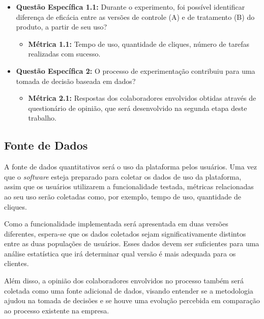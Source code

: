 \begin{itemize}
    \item \textbf{Questão Específica 1.1:}  Durante o experimento, foi possível identificar diferença de eficácia entre as versões de controle (A) e de tratamento (B) do produto, a partir de seu uso? 
    \begin{itemize}
        \item \textbf{Métrica 1.1:} Tempo de uso, quantidade de cliques, número de tarefas realizadas com sucesso.
    \end{itemize}
  
    \item\textbf{Questão Específica 2:} O processo de experimentação contribuiu para uma tomada de decisão baseada em dados?

    \begin{itemize}
        \item\textbf{Métrica 2.1:} Respostas dos colaboradores envolvidos obtidas através de questionário de opinião, que será desenvolvido na segunda etapa deste trabalho.
    \end{itemize}
    
\end{itemize}

\subsection{Fonte de Dados}

A fonte de dados quantitativos será o uso da plataforma pelos usuários. Uma vez que o \textit{software} esteja preparado para coletar os dados de uso da plataforma, assim que os usuários utilizarem a funcionalidade testada, métricas relacionadas ao seu uso serão coletadas como, por exemplo, tempo de uso, quantidade de cliques.

Como a funcionalidade implementada será apresentada em duas versões diferentes, espera-se que os dados coletados sejam significativamente distintos entre as duas populações de usuários. Esses dados devem ser suficientes para uma análise estatística que irá determinar qual versão é mais adequada para os clientes.

Além disso, a opinião dos colaboradores envolvidos no processo também será coletada como uma fonte adicional de dados, visando entender se a metodologia ajudou na tomada de decisões e se houve uma evolução percebida em comparação ao processo existente na empresa.
